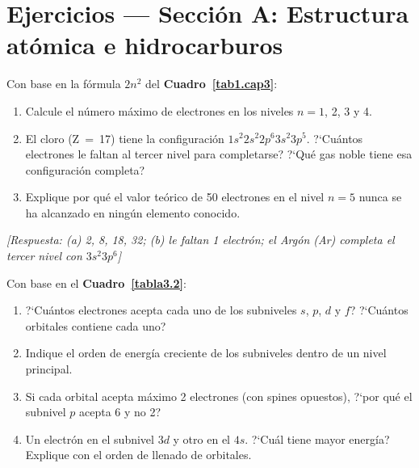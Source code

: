 
\section*{Ejercicios --- Secci\'on A: Estructura at\'omica e hidrocarburos}
\label{sec:ejercicios_cap04a}

\begin{bloque_ejercicios}

\begin{ejercicios}

\item Con base en la f\'ormula $2n^2$ del \textbf{Cuadro~\ref{tab1.cap3}}:

\begin{enumerate}[label=\alph*)]
    \item Calcule el n\'umero m\'aximo de electrones en los niveles
          $n = 1$, 2, 3 y 4.
    \item El cloro (Z~=~17) tiene la configuraci\'on
          $1s^2 2s^2 2p^6 3s^2 3p^5$. ?`Cu\'antos electrones le faltan
          al tercer nivel para completarse? ?`Qu\'e gas noble tiene
          esa configuraci\'on completa?
    \item Explique por qu\'e el valor te\'orico de 50 electrones en
          el nivel $n = 5$ nunca se ha alcanzado en ning\'un elemento
          conocido.
\end{enumerate}

\textit{[Respuesta: (a) 2, 8, 18, 32;
(b) le faltan 1 electr\'on; el Arg\'on (Ar) completa el tercer nivel
con $3s^2 3p^6$]}

\item Con base en el \textbf{Cuadro~\ref{tabla3.2}}:

\begin{enumerate}[label=\alph*)]
    \item ?`Cu\'antos electrones acepta cada uno de los subniveles
          $s$, $p$, $d$ y $f$? ?`Cu\'antos orbitales contiene cada uno?
    \item Indique el orden de energ\'ia creciente de los subniveles
          dentro de un nivel principal.
    \item Si cada orbital acepta m\'aximo 2 electrones (con spines
          opuestos), ?`por qu\'e el subnivel $p$ acepta 6 y no 2?
    \item Un electr\'on en el subnivel $3d$ y otro en el $4s$.
          ?`Cu\'al tiene mayor energ\'ia? Explique con el orden
          de llenado de orbitales.
\end{enumerate}


\end{ejercicios}
\end{bloque_ejercicios}
